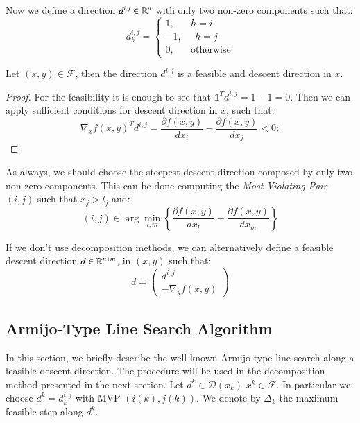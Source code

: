 Now we define a direction $d^{i,j} \in \mathbb{R}^n$ with only two non-zero components such that:
\begin{equation}\label{eq:direction}
d_h^{i,j}= 
\begin{cases}
1, \quad \text{    } h=i\\
-1, \text{    } \text{    } h=j\\
0, \quad \text{    } \text{otherwise}
\end{cases}
\end{equation}

\begin{proposition}
Let $(x,y) \in \mathcal{F}$, then the direction $d^{i,j}$ is a feasible and descent direction in $x$.
\end{proposition}
\begin{proof}
For the feasibility it is enough to see that $\mathds{1}^Td^{i,j}=1-1=0$.
Then we can apply sufficient conditions for descent direction in $x$, such that:
\begin{equation*}
 \nabla_xf(x,y)^Td^{i,j} =  \frac{\partial f(x,y)}{dx_i} - \frac{\partial f(x,y)}{dx_j}<0; 
\end{equation*}
\end{proof}

As always, we should choose the steepest descent direction composed by only two non-zero components.
This can be done computing the \emph{Most Violating Pair} $(i,j)$ such that $x_j>l_j$ and:
\begin{equation}
 (i,j) \in \arg \min_{l,m} \left\{\frac{\partial f(x,y)}{dx_l} - \frac{\partial f(x,y)}{dx_m}  \right\}
\end{equation}

If we don't use decomposition methods, we can alternatively define a feasible descent direction $d \in \mathbb{R}^{n+m}$, in $(x,y)$ such that:
\begin{equation}
 d=\left(\begin{matrix}d^{i,j}\\
 -\nabla_yf(x,y)
   \end{matrix}\right)
\end{equation}
\iffalse
\subsection{Armijo-Type Line Search Algorithm}
In this section, we briefly describe the well-known Armijo-type line search along a feasible descent direction. The procedure will be used in the decomposition method presented in the next section. 
Let $d^{k} \in \mathcal{D}(x_k)$  $x^{k} \in \mathcal{F}$. In particular we choose $d^{k}=d^{i,j}_k$ with MVP $(i(k),j(k))$.
We denote by $\Delta_{k}$ the maximum feasible step along $d^{k}$. 

